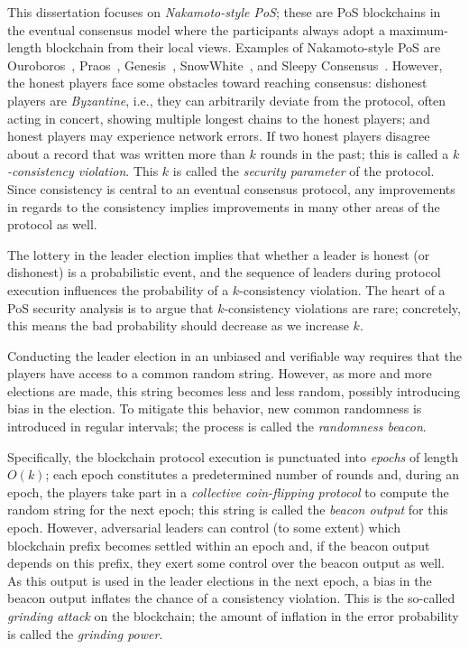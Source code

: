 This dissertation focuses on \emph{Nakamoto-style PoS}; 
these are PoS blockchains in the eventual consensus model where the participants 
always adopt a maximum-length blockchain from their local views. 
Examples of Nakamoto-style PoS are Ouroboros~\cite{Ouroboros}, Praos~\cite{Praos}, 
Genesis~\cite{Genesis}, SnowWhite~\cite{SnowWhite}, 
and Sleepy Consensus~\cite{Sleepy}.
However, the honest players face some obstacles toward reaching consensus: 
dishonest players are \emph{Byzantine}, i.e., 
they can arbitrarily deviate from the protocol, 
often acting in concert, 
showing multiple longest chains to the honest players;
and honest players may experience network errors. 
If two honest players disagree about a record that was 
written more than $k$ rounds in the past;
this is called a \emph{$k$-consistency violation}. 
This $k$ is called the \emph{security parameter} of the protocol.
Since consistency is central to an eventual consensus protocol, 
any improvements in regards to the consistency implies 
improvements in many other areas of the protocol as well.


The lottery in the leader election implies that 
whether a leader is honest (or dishonest) is a probabilistic event, 
and the sequence of leaders during protocol execution 
influences the probability of a $k$-consistency violation.
The heart of a PoS security analysis is to argue that $k$-consistency violations are rare; 
concretely, this means the bad probability should decrease as we increase $k$. 



Conducting the leader election in an unbiased and verifiable way 
requires that the players have access to a common random string. 
However, as more and more elections are made, 
this string becomes less and less random, possibly introducing bias in the election. 
To mitigate this behavior, 
new common randomness is introduced in regular intervals; 
the process is called the \emph{randomness beacon}.

Specifically, the blockchain protocol execution is punctuated into \emph{epochs} of length $O(k)$; 
each epoch constitutes a predetermined number of rounds 
and, during an epoch, 
the players take part in a \emph{collective coin-flipping protocol} 
to compute the random string for the next epoch; 
this string is called the \emph{beacon output} for this epoch.
However, adversarial leaders can control (to some extent) 
which blockchain prefix becomes settled within an epoch and, 
if the beacon output depends on this prefix,  
they exert some control over the beacon output as well. 
As this output is used in the leader elections in the next epoch, 
a bias in the beacon output inflates the chance of a consistency violation. 
This is the so-called \emph{grinding attack} on the blockchain; 
the amount of inflation in the error probability is called the \emph{grinding power}.


